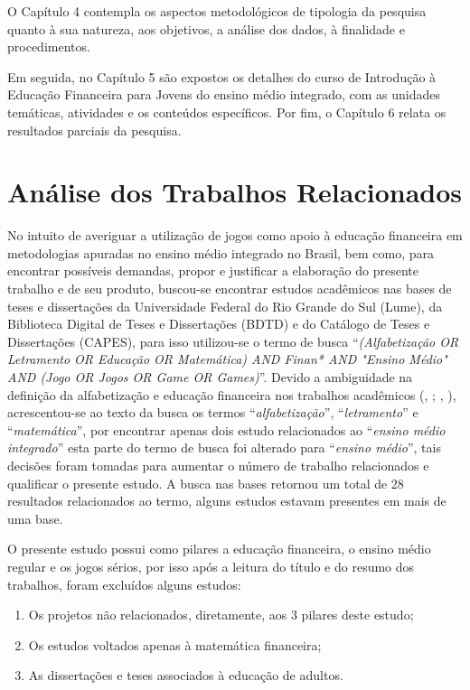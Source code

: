 O Capítulo 4 contempla os aspectos metodológicos de tipologia da pesquisa quanto à sua natureza, aos objetivos, a análise dos dados, à finalidade e procedimentos.

Em seguida, no Capítulo 5 são expostos os detalhes do curso de Introdução à Educação Financeira para Jovens do ensino médio integrado, com as unidades temáticas, atividades e os conteúdos específicos. Por fim, o Capítulo 6 relata os resultados parciais da pesquisa.

\chapter{Análise dos Trabalhos Relacionados}
No intuito de averiguar a utilização de jogos como apoio à educação financeira em metodologias apuradas no ensino médio integrado no Brasil, bem como, para encontrar possíveis demandas, propor e justificar a elaboração do presente trabalho e de seu produto, buscou-se encontrar estudos acadêmicos nas bases de teses e dissertações da Universidade Federal do Rio Grande do Sul (Lume), da Biblioteca Digital de Teses e Dissertações (BDTD) e do Catálogo de Teses e Dissertações (CAPES), para isso utilizou-se o termo de busca “\textit{(Alfabetização OR Letramento OR Educação OR Matemática) AND Finan* AND "Ensino Médio" AND (Jogo OR Jogos OR Game OR Games)}”. Devido a ambiguidade na definição da alfabetização e educação financeira nos trabalhos acadêmicos (\citeauthor{huston2010}, \citeyear{huston2010}; \citeauthor{campos2013}, \citeyear{campos2013}), acrescentou-se ao texto da busca os termos “\textit{alfabetização}”, “\textit{letramento}” e “\textit{matemática}”, por encontrar apenas dois estudo relacionados ao “\textit{ensino médio integrado}” esta parte do termo de busca foi alterado para “\textit{ensino médio}”, tais decisões foram tomadas para aumentar o número de trabalho relacionados e qualificar o presente estudo. A busca nas bases retornou um total de 28 resultados relacionados ao termo, alguns estudos estavam presentes em mais de uma base.

O presente estudo possui como pilares a educação financeira, o ensino médio regular e os jogos sérios, por isso após a leitura do título e do resumo dos trabalhos, foram excluídos alguns estudos:

\begin{enumerate}
    \item Os projetos não relacionados, diretamente, aos 3 pilares deste estudo;
    \item Os estudos voltados apenas à matemática financeira;
    \item As dissertações e teses associados à educação de adultos.
\end{enumerate}

